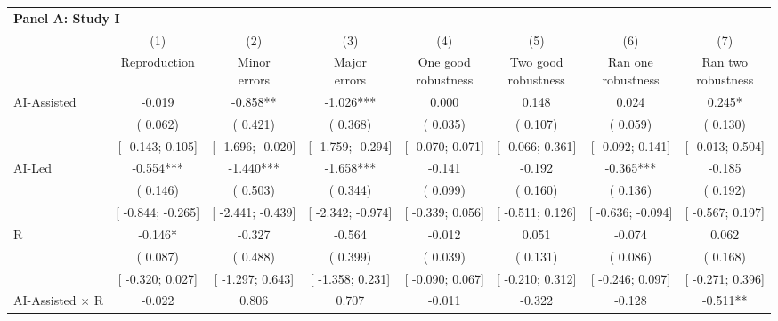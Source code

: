 \def\sym#1{\ifmmode^{#1}\else\(^{#1}\)\fi}
\begin{tabular}{l*{7}{c}}
\hline\hline
\multicolumn{8}{l}{\textbf{Panel A: Study I}}\\
& (1) & (2) & (3) & (4) & (5) & (6) & (7)\\
                    &Reproduction   &\shortstack[c]{Minor\\errors}   &\shortstack[c]{Major\\errors}   &\shortstack[c]{One good\\robustness}   &\shortstack[c]{Two good\\robustness}   &\shortstack[c]{Ran one\\robustness}   &\shortstack[c]{Ran two\\robustness}   \\
\hline
AI-Assisted         &   -0.019   &   -0.858**   &   -1.026***   &    0.000   &    0.148   &    0.024   &    0.245*   \\
                    &(    0.062)   &(    0.421)   &(    0.368)   &(    0.035)   &(    0.107)   &(    0.059)   &(    0.130)   \\
                    &[   -0.143;     0.105]   &[   -1.696;    -0.020]   &[   -1.759;    -0.294]   &[   -0.070;     0.071]   &[   -0.066;     0.361]   &[   -0.092;     0.141]   &[   -0.013;     0.504]   \\
AI-Led         &   -0.554***   &   -1.440***   &   -1.658***   &   -0.141   &   -0.192   &   -0.365***   &   -0.185   \\
                    &(    0.146)   &(    0.503)   &(    0.344)   &(    0.099)   &(    0.160)   &(    0.136)   &(    0.192)   \\
                    &[   -0.844;    -0.265]   &[   -2.441;    -0.439]   &[   -2.342;    -0.974]   &[   -0.339;     0.056]   &[   -0.511;     0.126]   &[   -0.636;    -0.094]   &[   -0.567;     0.197]   \\
R         &   -0.146*   &   -0.327   &   -0.564   &   -0.012   &    0.051   &   -0.074   &    0.062   \\
                    &(    0.087)   &(    0.488)   &(    0.399)   &(    0.039)   &(    0.131)   &(    0.086)   &(    0.168)   \\
                    &[   -0.320;     0.027]   &[   -1.297;     0.643]   &[   -1.358;     0.231]   &[   -0.090;     0.067]   &[   -0.210;     0.312]   &[   -0.246;     0.097]   &[   -0.271;     0.396]   \\
AI-Assisted $\times$ R         &   -0.022   &    0.806   &    0.707   &   -0.011   &   -0.322   &   -0.128   &   -0.511**   \\

\end{tabular}
